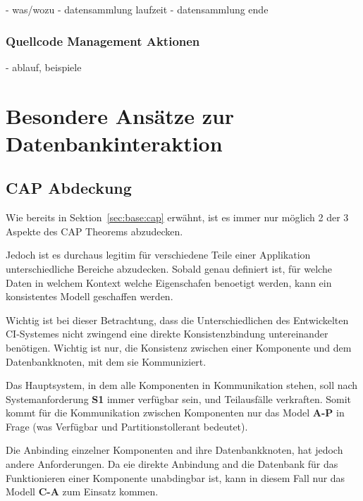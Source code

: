 - was/wozu
- datensammlung laufzeit
- datensammlung ende

\subsubsection{Quellcode Management Aktionen}

- ablauf, beispiele



\section{Besondere Ans\"atze zur Datenbankinteraktion}



\subsection{CAP Abdeckung}

Wie bereits in Sektion~\ref{sec:base:cap} erw\"ahnt,
ist es immer nur m\"oglich 2 der 3 Aspekte des CAP Theorems abzudecken.

Jedoch ist es durchaus legitim f\"ur verschiedene Teile einer Applikation unterschiedliche Bereiche abzudecken.
Sobald genau definiert ist, f\"ur welche Daten in welchem Kontext welche Eigenschafen benoetigt werden,
kann ein konsistentes Modell geschaffen werden.

Wichtig ist bei dieser Betrachtung, dass die Unterschiedlichen des Entwickelten CI-Systemes
nicht zwingend eine direkte Konsistenzbindung untereinander ben\"otigen.
Wichtig ist nur, die Konsistenz zwischen einer Komponente und dem Datenbankknoten,
mit dem sie Kommuniziert.

Das Hauptsystem, in dem alle Komponenten in Kommunikation stehen,
soll nach Systemanforderung \textbf{S1} immer verf\"ugbar sein, und Teilausf\"alle verkraften.
Somit kommt f\"ur die Kommunikation zwischen Komponenten nur das Model \textbf{A-P} in Frage
(was Verf\"ugbar und Partitionstollerant bedeutet).

Die Anbinding einzelner Komponenten and ihre Datenbankknoten, hat jedoch andere Anforderungen.
Da eie direkte Anbindung and die Datenbank f\"ur das Funktionieren einer Komponente unabdingbar ist,
kann in diesem Fall nur das Modell \textbf{C-A} zum Einsatz kommen.




